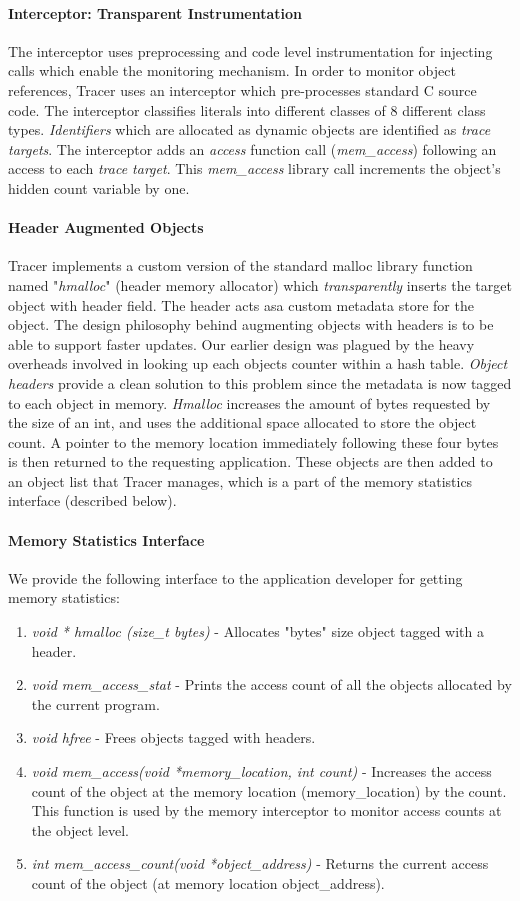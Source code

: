 \paragraph{Interceptor: Transparent Instrumentation}
The interceptor uses preprocessing and code level instrumentation for injecting calls which enable the monitoring mechanism. In order to monitor object references, Tracer uses an interceptor which pre-processes standard C source code. The interceptor classifies literals into different classes of 8 different class types. {\emph{Identifiers}} which are allocated as dynamic objects are identified as {\emph{trace targets}}.  The interceptor adds an {\emph{access}} function call ({\emph{mem\_access}}) following an access to each {\emph{trace target}}. This {\emph{mem\_access}} library call increments the object's hidden count variable by one. 
\paragraph{Header Augmented Objects}
Tracer implements a custom version of the standard malloc library function named "{\emph{hmalloc}}" (header memory allocator) which {\emph{transparently}} inserts the target object with header field. The header acts asa custom metadata store for the object. The design philosophy behind augmenting objects with headers is to be able to support faster updates. Our earlier design was plagued by the heavy overheads involved in looking up each objects counter within a hash table. {\emph{Object headers}} provide a clean solution to this problem since the metadata is now tagged to each object in memory. {\emph{Hmalloc}} increases the amount of bytes requested by the size of an int, and uses the additional space allocated to store the object count. A pointer to the memory location immediately following these four bytes is then returned to the requesting application. These objects are then added to an object list that Tracer manages, which is a part of the memory statistics interface (described below).
\paragraph{Memory Statistics Interface}
We provide the following interface to the application developer for getting memory statistics:
\begin{enumerate}
\item {\emph{void * hmalloc (size\_t bytes)}} - Allocates "bytes" size object tagged with a header.
\item {\emph{void mem\_access\_stat}} - Prints the access count of all the objects allocated by the current program.
\item {\emph{void hfree}} - Frees objects tagged with headers.
\item{\emph{void mem\_access(void *memory\_location, int count)}} - Increases the access count of the object at the memory location (memory\_location) by the count. This function is used by the memory interceptor to monitor access counts at the object level.
\item {\emph{int mem\_access\_count(void *object\_address)}} - Returns the current access count of the object (at memory location object\_address).
\end{enumerate}
